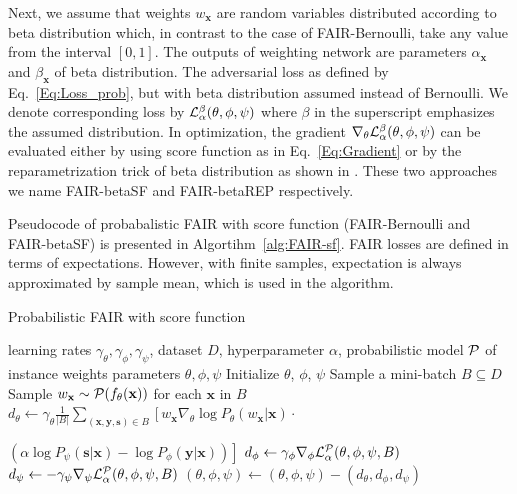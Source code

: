\documentclass[preprint,12pt]{elsarticle}
\begin{document}
Next, we assume that weights $w_\mathbf{x}$ are random variables distributed according to beta distribution which, in contrast to the case of FAIR-Bernoulli, take any value from the interval $[0,1]$. The outputs of weighting network are parameters $\alpha_\mathbf{x}$ and $\beta_\mathbf{x}$ of beta distribution. The adversarial loss as defined by Eq.~\ref{Eq:Loss_prob}, but with beta distribution assumed instead of Bernoulli. We denote corresponding loss by ${\cal L}^\beta_\alpha(\theta,\phi,\psi)$ where $\beta$ in the superscript emphasizes the assumed distribution. In optimization, the gradient $\nabla_{\theta}{\cal L}^\beta_{\alpha}(\theta, \phi, \psi)$
can be evaluated either by using score function as in Eq.~\ref{Eq:Gradient} or by the reparametrization trick of beta distribution as shown in \cite{shah2015empirical}. These two approaches we name FAIR-betaSF and FAIR-betaREP respectively.

Pseudocode of probabalistic FAIR with score function (FAIR-Bernoulli and FAIR-betaSF) is presented in Algortihm~\ref{alg:FAIR-sf}. FAIR losses are defined in terms of expectations. However, with finite samples, expectation is always approximated by sample mean, which is used in the algorithm.

\begin{algorithm}
	\caption{Probabilistic FAIR with score function}
	\label{alg:FAIR-sf}
	\begin{algorithmic}
		 learning rates $\gamma_\theta, \gamma_\phi, \gamma_\psi$, dataset $D$,  hyperparameter $\alpha$, probabilistic model ${\cal P}$ of instance weights
		 parameters $\theta,\phi,\psi$
		\vspace{2mm}
		\State Initialize $\theta$, $\phi$, $\psi$
		\State Sample a mini-batch $B\subseteq D$
		\State Sample $w_\mathbf{x}\sim {\cal P}(f_\theta(\mathbf{x}))$ for each $\mathbf{x}$ in $B$
		\State $d_{\theta} \leftarrow \gamma_\theta\frac{1}{|B|} \sum_{(\mathbf{x},\mathbf{y},\mathbf{s})\in B}\left[w_\mathbf{x}\nabla_{\theta}\log P_\theta(w_\mathbf{x}|\mathbf{x})\cdot\right.$
		
		\hspace{3cm}$\left.(\alpha\log P_\psi(\mathbf{s}|\mathbf{x})-\log P_\phi(\mathbf{y}|\mathbf{x}))\right]$
		\State $d_{\phi} \leftarrow \gamma_\phi\nabla_{\phi}{\cal L}^{\cal P}_\alpha(\theta,\phi,\psi,B)$
		\State $d_{\psi} \leftarrow -\gamma_\psi\nabla_{\psi}{\cal L}^{\cal P}_\alpha(\theta,\phi,\psi,B)$
		\State $(\theta,\phi,\psi) \leftarrow (\theta,\phi,\psi) - (d_{\theta}, d_{\phi}, d_{\psi})$
		\EndWhile
	\end{algorithmic}
\end{algorithm}
\end{document}
